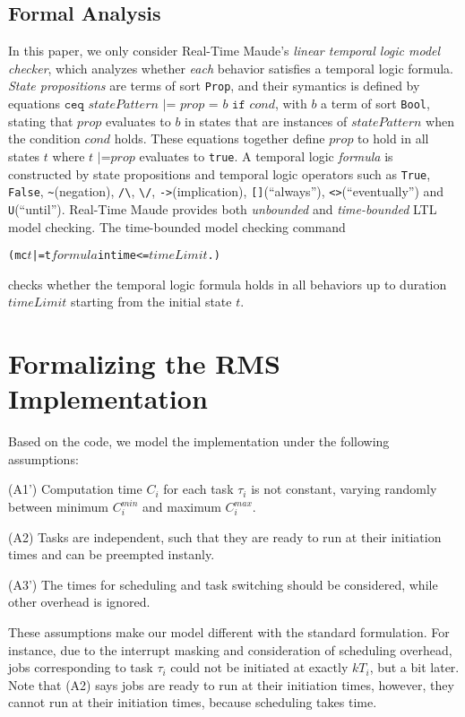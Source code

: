 \documentclass{llncs}
\begin{document}
\subsection{Formal Analysis}
In this paper, we only consider Real-Time Maude's \emph{linear
  temporal logic model checker}, which analyzes whether \emph{each}
behavior satisfies a temporal logic formula. \emph{State propositions}
are terms of sort \verb|Prop|, and their symantics is defined by
equations $\texttt{ceq } statePattern \texttt{ |= } prop \texttt{ = }
b \texttt{ if } cond$, with $b$ a term of sort \verb|Bool|, stating
that $prop$ evaluates to $b$ in states that are instances of
$statePattern$ when the condition $cond$ holds. These equations
together define $prop$ to hold in all states $t$ where $t \texttt{ |=
} prop$ evaluates to \verb|true|. A temporal logic \emph{formula} is
constructed by state propositions and temporal logic operators such as
\verb|True|, \verb|False|, \verb|~|(negation), \verb|/\|, \verb|\/|,
\verb|->|(implication), \verb|[]|(``always''),
\verb|<>|(``eventually'') and \verb|U|(``until''). Real-Time Maude
provides both \emph{unbounded} and \emph{time-bounded} LTL model
checking. The time-bounded model checking command
\begin{alltt}
  (mc \(t\) |=t \(formula\) in time <= \(timeLimit\) .)
\end{alltt}
checks whether the temporal logic formula holds in all behaviors up to
duration $timeLimit$ starting from the initial state $t$.

\section{Formalizing the RMS Implementation}
\label{s:formalism}
Based on the code, we model the implementation under the following
assumptions:

(A1') Computation time $C_i$ for each task $\tau_i$ is not constant,
varying randomly between minimum $C^{min}_i$ and maximum $C^{max}_i$.

(A2) Tasks are independent, such that they are ready to run at their
initiation times and can be preempted instanly.

(A3') The times for scheduling and task switching should be
considered, while other overhead is ignored.

These assumptions make our model different with the standard
formulation. For instance, due to the interrupt masking and
consideration of scheduling overhead, jobs corresponding to task
$\tau_i$ could not be initiated at exactly $kT_i$, but a bit later.
Note that (A2) says jobs are ready to run at their initiation times,
however, they cannot run at their initiation times, because scheduling
takes time.
\end{document}

